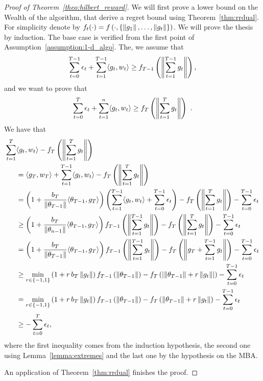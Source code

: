 \begin{proof}[Proof of Theorem~\ref{theo:hilbert_reward}]
  We will first prove a lower bound on the Wealth of the algorithm, that derive a regret bound using Theorem~\ref{thm:rrdual}.
  For simplicity denote by $f_t(\cdot)=f\left(\cdot, \{\left\|{g_1}\right\|, \ldots, \left\|{g_t}\right\|\}\right)$.
  We will prove the thesis by induction. The base case is verified from the first point of Assumption~\ref{assumption:1-d_algo}. The, we assume that 
  \[
  \sum_{t=0}^{T-1} \epsilon_t + \sum_{t=1}^{T-1} \langle g_t, w_t \rangle \geq f_{T-1}\left( \left\|{\sum_{t=1}^{T-1} g_t}\right\|\right),
  \]
  and we want to prove that 
  \[
  \sum_{t=0}^{T} \epsilon_t + \sum_{t=1}^{n} \langle g_t, w_t \rangle \geq f_{T}\left( \left\|{\sum_{t=1}^{T} g_t}\right\|\right)~.
  \]
  We have that
  \begin{align*}
  \sum_{t=1}^{T} &\langle g_t, w_t \rangle - f_T\left( \left\|{\sum_{t=1}^{T} g_t}\right\|\right) \\
  &= \langle g_T, w_T \rangle + \sum_{t=1}^{T-1} \langle g_t, w_t \rangle - f_T\left( \left\|{\sum_{t=1}^{T} g_t}\right\|\right)\\
  &= \left(1+\frac{b_T}{\left\|{\theta_{T-1}}\right\|}\langle \theta_{T-1},g_T \rangle \right)\left(\sum_{t=1}^{T-1} \langle g_t, w_t \rangle + \sum_{t=0}^{T-1} \epsilon_t \right) - f_T\left( \left\|{\sum_{t=1}^{T} g_t}\right\|\right) - \sum_{t=0}^{T-1} \epsilon_t\\
  &\geq \left(1+\frac{b_T}{\left\|{\theta_{n-1}}\right\|}\langle \theta_{T-1},g_T\rangle \right) f_{T-1}\left( \left\|{\sum_{t=1}^{T-1} g_t}\right\|\right) - f_T\left( \left\|{\sum_{t=1}^{T} g_t}\right\|\right) - \sum_{t=0}^{T-1} \epsilon_t\\
  &= \left(1+\frac{b_T}{\left\|{\theta_{T-1}}\right\|}\langle \theta_{T-1},g_T \rangle \right) f_{T-1}\left( \left\|{\sum_{t=1}^{T-1} g_t}\right\|\right) - f_T\left( \left\|{g_T + \sum_{t=1}^{T-1} g_t}\right\|\right)- \sum_{t=0}^{T-1} \epsilon_t\\
  &\geq \min_{r\in \{-1,1\}} \left(1+ r\, b_T \left\|{g_t}\right\|\right) f_{T-1}\left( \left\|{\theta_{T-1}}\right\|\right) - f_T\left(\left| \left\|{\theta_{T-1}}\right\| + r\left\|{g_t}\right\|\right|\right) - \sum_{t=0}^{T-1} \epsilon_t\\
  &= \min_{r\in \{-1,1\}} \left(1+ r\, b_T \left\|{g_t}\right\|\right) f_{T-1}\left( \left\|{\theta_{T-1}}\right\|\right) - f_T\left( \left\|{\theta_{T-1}}\right\| + r \left\|{g_t}\right\|\right)- \sum_{t=0}^{T-1} \epsilon_t\\
  &\geq -\sum_{t=0}^{T} \epsilon_t,
  \end{align*}
  where the first inequality comes from the induction hypothesis, the second one using Lemma~\ref{lemma:extremes} and the last one by the hypothesis on the \ac{MBA}.
  
  An application of Theorem~\ref{thm:rrdual} finishes the proof.
\end{proof}

